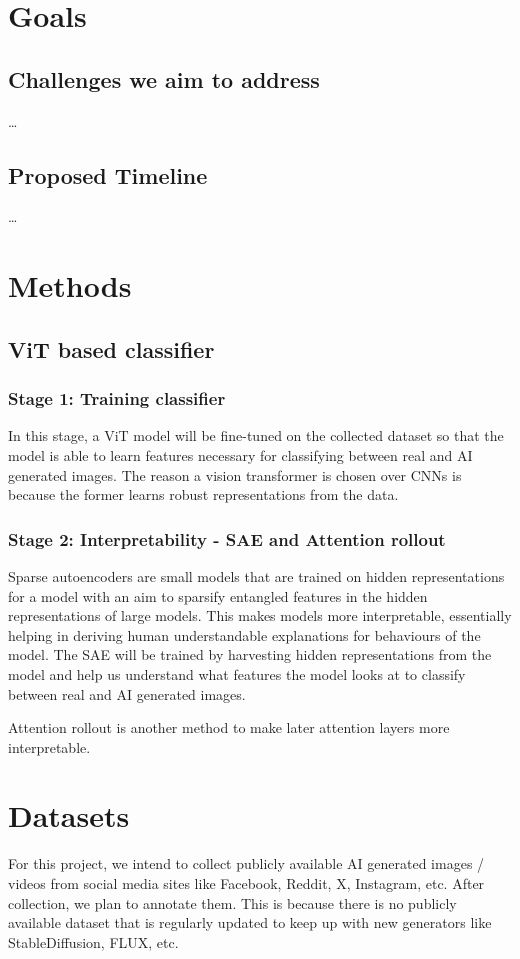 \documentclass[10pt,twocolumn,letterpaper]{article}
\begin{document}
\section{Goals}

\subsection{Challenges we aim to address}
\ldots

\subsection{Proposed Timeline}
\ldots 

\section{Methods}
\subsection{ViT based classifier}
\subsubsection{Stage 1: Training classifier}
In this stage, a ViT model \cite{dosovitskiyImageWorth16x162021} will be fine-tuned on the collected dataset so that the model is able to learn features necessary for classifying between real and AI generated images. The reason a vision transformer is chosen over CNNs is because the former learns robust representations from the data.

\subsubsection{Stage 2: Interpretability - SAE and Attention rollout}
Sparse autoencoders are small models that are trained on hidden representations for a model with an aim to sparsify entangled features in the hidden representations of large models. This makes models more interpretable, essentially helping in deriving human understandable explanations for behaviours of the model. The SAE will be trained by harvesting hidden representations from the model and help us understand what features the model looks at to classify between real and AI generated images.

Attention rollout \cite{abnarQuantifyingAttentionFlow2020} is another method to make later attention layers more interpretable.

\section{Datasets}
For this project, we intend to collect publicly available AI generated images / videos from social media sites like Facebook, Reddit, X, Instagram, etc. After collection, we plan to annotate them. This is because there is no publicly available dataset that is regularly updated to keep up with new generators like StableDiffusion, FLUX, etc. 
\end{document}
